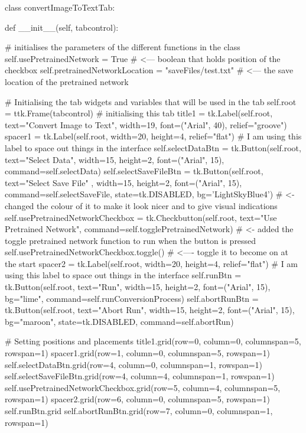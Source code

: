 \documentclass{report}
\begin{document}
\begin{python}
class convertImageToTextTab:

    def __init__(self, tabcontrol):

        # initialises the parameters of the different functions in the class
        self.usePretrainedNetwork = True  # <--- boolean that holds position of the checkbox
        self.pretrainedNetworkLocation = "saveFiles/test.txt" # <--- the save location of the pretrained network

        # Initialising the tab widgets and variables that will be used in the tab
        self.root = ttk.Frame(tabcontrol)  # initialising this tab
        title1 = tk.Label(self.root, text="Convert Image to Text", width=19,
				            font=("Arial", 40), relief="groove")
        spacer1 = tk.Label(self.root, width=20, height=4,
                           	relief="flat")  # I am using this label to space out things in the interface
        self.selectDataBtn = tk.Button(self.root, text="Select Data", 
                            width=15, height=2, font=("Arial", 15),
                            command=self.selectData)
        self.selectSaveFileBtn = tk.Button(self.root, text="Select Save File"
                            , width=15, height=2, font=("Arial", 15), 
                            command=self.selectSaveFile, state=tk.DISABLED,
                            bg='LightSkyBlue4')  # <- changed the colour of it to make it look nicer and to give visual indications
        self.usePretrainedNetworkCheckbox = tk.Checkbutton(self.root, 
                            text="Use Pretrained Network",
                            command=self.togglePretrainedNetwork)  # <- added the toggle pretrained network function to run when the button is pressed
        self.usePretrainedNetworkCheckbox.toggle() # <---- toggle it to become on at the start
        spacer2 = tk.Label(self.root, width=20, height=4,
                           relief="flat")  # I am using this label to space out things in the interface
        self.runBtn = tk.Button(self.root, text="Run", width=15, height=2, 
                            font=("Arial", 15), bg="lime",
                            command=self.runConversionProcess)
        self.abortRunBtn = tk.Button(self.root, text="Abort Run", width=15, 
				     height=2, font=("Arial", 15), 
				     bg="maroon", state=tk.DISABLED, 
				     command=self.abortRun)

        # Setting positions and placements
        title1.grid(row=0, column=0, columnspan=5, rowspan=1)
        spacer1.grid(row=1, column=0, columnspan=5, rowspan=1)
        self.selectDataBtn.grid(row=4, column=0, columnspan=1, rowspan=1)
        self.selectSaveFileBtn.grid(row=4, column=4, columnspan=1, rowspan=1)
        self.usePretrainedNetworkCheckbox.grid(row=5, column=4, columnspan=5, rowspan=1)
        spacer2.grid(row=6, column=0, columnspan=5, rowspan=1)
        self.runBtn.grid
        self.abortRunBtn.grid(row=7, column=0, columnspan=1, rowspan=1)


\end{python}
\end{document}

